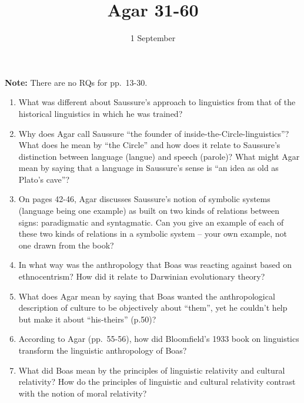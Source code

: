 \documentclass[doc,12pt]{apa6}
\providecommand{\tightlist}{%
  \setlength{\itemsep}{0pt}\setlength{\parskip}{0pt}}
\begin{document}
\title{Agar 31-60}
\author{1 September}
\maketitle


\textbf{Note:} There are no RQs for pp.~13-30.

\begin{enumerate}
\def\labelenumi{\arabic{enumi}.}
\tightlist
\item
  What was different about Saussure's approach to linguistics from that
  of the historical linguistics in which he was trained?
\item
  Why does Agar call Saussure ``the founder of
  inside-the-Circle-linguistics''? What does he mean by ``the Circle''
  and how does it relate to Saussure's distinction between language
  (langue) and speech (parole)? What might Agar mean by saying that a
  language in Saussure's sense is ``an idea as old as Plato's cave''?
\item
  On pages 42-46, Agar discusses Saussure's notion of symbolic systems
  (language being one example) as built on two kinds of relations
  between signs: paradigmatic and syntagmatic. Can you give an example
  of each of these two kinds of relations in a symbolic system -- your
  own example, not one drawn from the book?\\
\item
  In what way was the anthropology that Boas was reacting against based
  on ethnocentrism? How did it relate to Darwinian evolutionary theory?
\item
  What does Agar mean by saying that Boas wanted the anthropological
  description of culture to be objectively about ``them'', yet he
  couldn't help but make it about ``his-theirs'' (p.50)?
\item
  According to Agar (pp.~55-56), how did Bloomfield's 1933 book on
  linguistics transform the linguistic anthropology of Boas?
\item
  What did Boas mean by the principles of linguistic relativity and
  cultural relativity? How do the principles of linguistic and cultural
  relativity contrast with the notion of moral relativity?
\end{enumerate}
\end{document}
